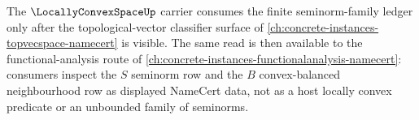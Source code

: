 The $\LocallyConvexSpaceUp$ carrier consumes the finite seminorm-family ledger only after the topological-vector classifier surface of \autoref{ch:concrete-instances-topvecspace-namecert} is visible. The same read is then available to the functional-analysis route of \autoref{ch:concrete-instances-functionalanalysis-namecert}: consumers inspect the $S$ seminorm row and the $B$ convex-balanced neighbourhood row as displayed NameCert data, not as a host locally convex predicate or an unbounded family of seminorms.
